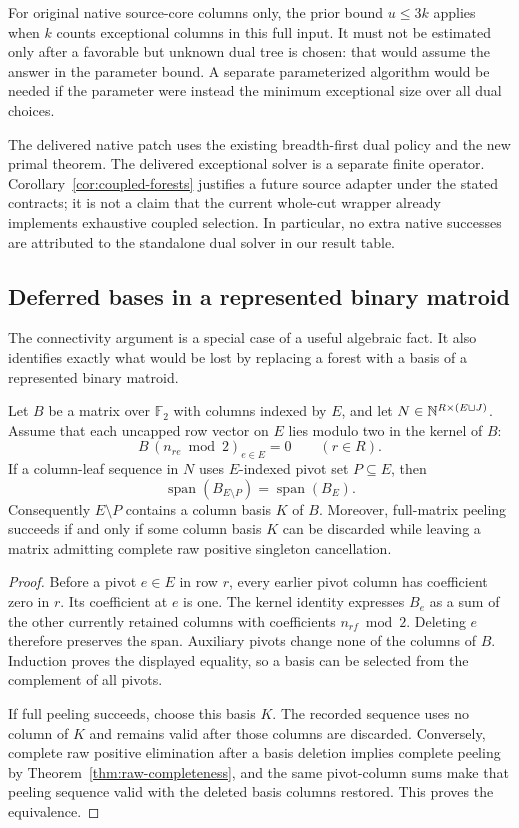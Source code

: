 For original native source-core columns only, the prior bound $u\le3k$ applies when
$k$ counts exceptional columns in this full input.  It must not be
estimated only after a favorable but unknown dual tree is chosen: that
would assume the answer in the parameter bound.  A separate parameterized
algorithm would be needed if the parameter were instead the minimum
exceptional size over all dual choices.

The delivered native patch uses the existing breadth-first dual policy
and the new primal theorem.  The delivered exceptional solver is a
separate finite operator.  Corollary~\ref{cor:coupled-forests} justifies a
future source adapter under the stated contracts; it is not a claim that
the current whole-cut wrapper already implements exhaustive coupled
selection.  In particular, no extra native successes are attributed to
the standalone dual solver in our result table.

\subsection{Deferred bases in a represented binary matroid}

The connectivity argument is a special case of a useful algebraic fact.
It also identifies exactly what would be lost by replacing a forest with
a basis of a represented binary matroid.

\begin{theorem}
\label{thm:deferred-basis}
Let $B$ be a matrix over $\mathbb F_2$ with columns indexed by $E$, and
let $N\in\mathbb N^{R\times(E\sqcup J)}$.  Assume that each uncapped row
vector on $E$ lies modulo two in the kernel of $B$:
\[
 B\,(n_{re}\bmod2)_{e\in E}=0\qquad(r\in R).
\]
If a column-leaf sequence in $N$ uses $E$-indexed pivot set
$P\subseteq E$, then
\[
 \operatorname{span}(B_{E\setminus P})=
 \operatorname{span}(B_E).
\]
Consequently $E\setminus P$ contains a column basis $K$ of $B$.
Moreover, full-matrix peeling succeeds if and only if some column basis
$K$ can be discarded while leaving a matrix admitting complete raw
positive singleton cancellation.
\end{theorem}
\begin{proof}
Before a pivot $e\in E$ in row $r$, every earlier pivot column has
coefficient zero in $r$.  Its coefficient at $e$ is one.  The kernel
identity expresses $B_e$ as a sum of the other currently retained columns
with coefficients $n_{rf}\bmod2$.  Deleting $e$ therefore preserves
the span.  Auxiliary pivots change none of the columns of $B$.
Induction proves the displayed equality, so a basis can be selected from
the complement of all pivots.

If full peeling succeeds, choose this basis $K$.  The recorded sequence
uses no column of $K$ and remains valid after those columns are discarded.
Conversely, complete raw positive elimination after a basis deletion
implies complete peeling by Theorem~\ref{thm:raw-completeness}, and the
same pivot-column sums make that peeling sequence valid with the deleted
basis columns restored.  This proves the equivalence.
\end{proof}


